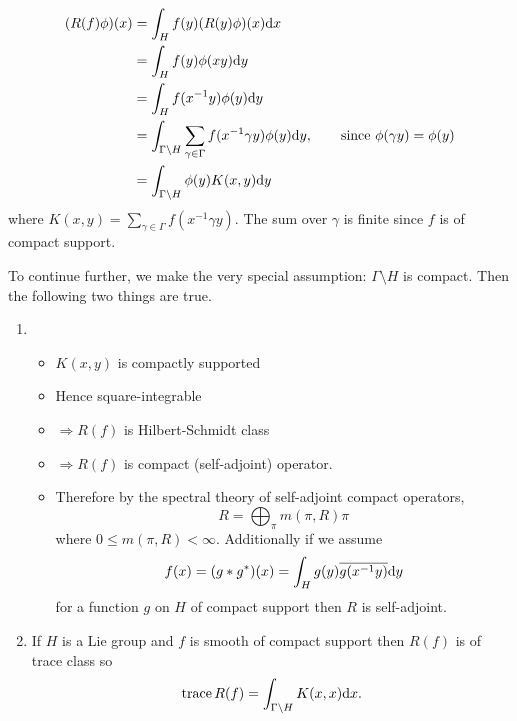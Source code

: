 \documentclass[11pt]{amsart}
\def\cb#1{{\color{black}#1}}
\def\d{\text d}
\def\bs{\setminus} 			%
\def\trace{\operatorname{trace}}
\theoremstyle{remark}
\begin{document}
\begin{align*}
	(R(f)\phi)(x) & = \int_H f(y) (R(y)\phi)(x) \d x \\
			& = \int_H f(y) \phi(xy) \d y \\
			& = \int_H f(x^{-1} y) \phi(y) \d y \\
			& = \int_{\Gamma\bs H} \sum_{\gamma \in \Gamma} f(x^{-1}\gamma y) \phi(y) \d y, \qquad \text{since } \phi(\gamma y) = \phi(y)\\
			& = \int_{\Gamma\bs H} \phi(y) K(x, y) \d y
\end{align*}
where $K(x, y) = \sum_{\gamma \in \Gamma} f(x^{-1}\gamma y)$. The sum over $\gamma$ is finite since $f$ is of compact support. 

To continue further, we make the very special assumption: \cb{$\Gamma\bs H$ is compact.} Then the following two things are true. 
\begin{enumerate}
\item 	\begin{itemize}
		\item[] $K(x, y)$ is compactly supported 
		\item[] Hence square-integrable
		\item[] $\Rightarrow R(f)$ is Hilbert-Schmidt class
		\item[] $\Rightarrow R(f)$ is compact (self-adjoint) operator. 
		\item[] Therefore by the spectral theory of self-adjoint compact operators,
			\[ \boxed{ R = \bigoplus_\pi m(\pi, R) \pi } \]
			where $0 \leq m(\pi, R) < \infty$. Additionally if we assume 
			\[ f(x) = (g*g^*)(x) = \int_H g(y) \overline{g(x^{-1}y)} \d y\]
			for a function $g$ on $H$ of compact support then $R$ is self-adjoint. 
		\end{itemize}

\item If $H$ is a Lie group and $f$ is smooth of compact support then $R(f)$ is of trace class so
	\[ \trace R(f) = \int_{\Gamma\bs H} K(x, x) \d x. \]
\end{enumerate}
\end{document}
